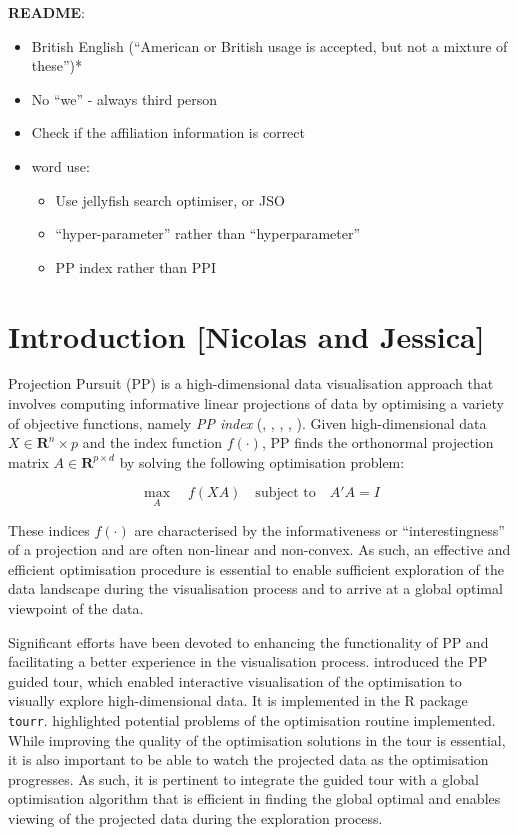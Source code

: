 \documentclass[
  number,
  preprint,
  3p]{elsarticle}
\providecommand{\tightlist}{%
  \setlength{\itemsep}{0pt}\setlength{\parskip}{0pt}}\usepackage{longtable,booktabs,array}
\begin{document}
\textbf{README}:

\begin{itemize}
\item
  British English (``American or British usage is accepted, but not a
  mixture of these'')*
\item
  No ``we'' - always third person
\item
  Check if the affiliation information is correct
\item
  word use:

  \begin{itemize}
  \tightlist
  \item
    Use jellyfish search optimiser, or JSO
  \item
    ``hyper-parameter'' rather than ``hyperparameter''
  \item
    PP index rather than PPI
  \end{itemize}
\end{itemize}

\section{Introduction {[}Nicolas and
Jessica{]}}\label{introduction-nicolas-and-jessica}

Projection Pursuit (PP) is a high-dimensional data visualisation
approach that involves computing informative linear projections of data
by optimising a variety of objective functions, namely \emph{PP index}
(\citet{hall1989polynomial}, \citet{cook1993projection},
\citet{lee2010projection}, \citet{Loperfido2018},
\citet{Loperfido2020}). Given high-dimensional data
\(X \in \mathbf{R}^{n }\times p\) and the index function \(f(\cdot)\),
PP finds the orthonormal projection matrix
\(A \in \mathbf{R}^{p \times d}\) by solving the following optimisation
problem:

\[
\underset{A}{\max } \quad f(XA) \quad \text{subject to} \quad A'A = I
\]

These indices \(f(\cdot)\) are characterised by the informativeness or
``interestingness'' of a projection and are often non-linear and
non-convex. As such, an effective and efficient optimisation procedure
is essential to enable sufficient exploration of the data landscape
during the visualisation process and to arrive at a global optimal
viewpoint of the data.

Significant efforts have been devoted to enhancing the functionality of
PP and facilitating a better experience in the visualisation process.
\citet{cook1995grand} introduced the PP guided tour, which enabled
interactive visualisation of the optimisation to visually explore
high-dimensional data. It is implemented in the R \citep{R} package
\texttt{tourr}\citep{tourr}. \citet{RJ-2021-105} highlighted potential
problems of the optimisation routine implemented. While improving the
quality of the optimisation solutions in the tour is essential, it is
also important to be able to watch the projected data as the
optimisation progresses. As such, it is pertinent to integrate the
guided tour with a global optimisation algorithm that is efficient in
finding the global optimal and enables viewing of the projected data
during the exploration process.
\end{document}
